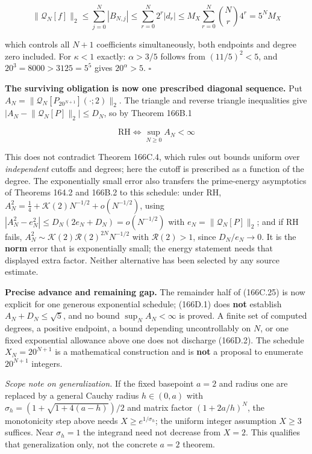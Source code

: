 \documentclass[
  11pt,
]{book}
\begin{document}
\[
\bigl\lVert\mathcal Q_N[f]\bigr\rVert_2\le\sum_{j=0}^N|B_{N,j}|
\le\sum_{r=0}^N2^r|d_r|
\le M_X\sum_{r=0}^N\binom Nr4^r=5^NM_X
\]

which controls all \(N+1\) coefficients simultaneously, both endpoints
and degree zero included. For \(\kappa<1\) exactly: \(\alpha>3/5\)
follows from \((11/5)^2<5\), and \(20^3=8000>3125=5^5\) gives
\(20^\alpha>5\). \(\square\)

\textbf{The surviving obligation is now one prescribed diagonal
sequence.} Put
\(A_N=\lVert\mathcal Q_N[P_{20^{N+1}}](\cdot;2)\rVert_2\). The triangle
and reverse triangle inequalities give
\(\bigl|A_N-\lVert\mathcal Q_N[P]\rVert_2\bigr|\le D_N\), so by Theorem
166B.1

\[
\boxed{\ \mathrm{RH}\iff\sup_{N\ge0}A_N<\infty\ }
\tag{166D.2}
\]

This does not contradict Theorem 166C.4, which rules out bounds uniform
over \emph{independent} cutoffs and degrees; here the cutoff is
prescribed as a function of the degree. The exponentially small error
also transfers the prime-energy asymptotics of Theorems 164.2 and 166B.2
to this schedule: under RH,
\(A_N^2=\tfrac14+\mathcal K(2)N^{-1/2}+o(N^{-1/2})\), using
\(|A_N^2-e_N^2|\le D_N(2e_N+D_N)=o(N^{-1/2})\) with
\(e_N=\lVert\mathcal Q_N[P]\rVert_2\); and if RH fails,
\(A_N^2\sim\mathcal K(2)\mathcal R(2)^{2N}N^{-1/2}\) with
\(\mathcal R(2)>1\), since \(D_N/e_N\to0\). It is the \textbf{norm}
error that is exponentially small; the energy statement needs that
displayed extra factor. Neither alternative has been selected by any
source estimate.

\textbf{Precise advance and remaining gap.} The remainder half of
(166C.25) is now explicit for one generous exponential schedule;
(166D.1) does \textbf{not} establish \(A_N+D_N\le\sqrt5\), and no bound
\(\sup_NA_N<\infty\) is proved. A finite set of computed degrees, a
positive endpoint, a bound depending uncontrollably on \(N\), or one
fixed exponential allowance above one does not discharge (166D.2). The
schedule \(X_N=20^{N+1}\) is a mathematical construction and is
\textbf{not} a proposal to enumerate \(20^{N+1}\) integers.

\emph{Scope note on generalization.} If the fixed basepoint \(a=2\) and
radius one are replaced by a general Cauchy radius \(h\in(0,a)\) with
\(\sigma_h=(1+\sqrt{1+4(a-h)})/2\) and matrix factor \((1+2a/h)^N\), the
monotonicity step above needs \(X\ge e^{1/\sigma_h}\); the uniform
integer assumption \(X\ge3\) suffices. Near \(\sigma_h=1\) the integrand
need not decrease from \(X=2\). This qualifies that generalization only,
not the concrete \(a=2\) theorem.
\end{document}
